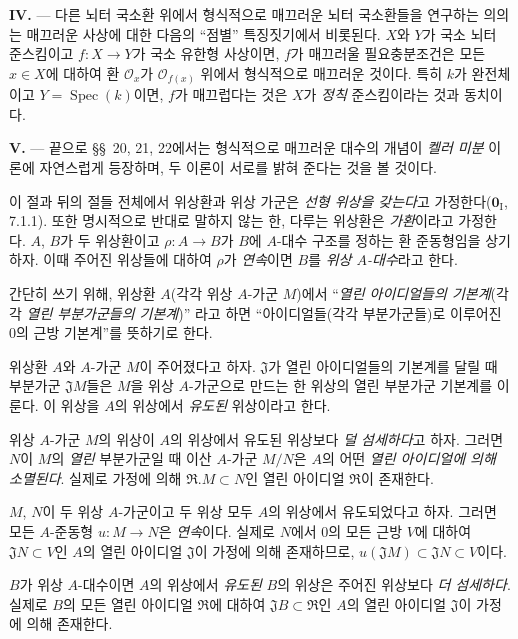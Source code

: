 \begin{env}[19.0.2]
\medskip\noindent\textbf{IV.} --- 다른 뇌터 국소환 위에서 형식적으로
매끄러운 뇌터 국소환들을 연구하는 의의는 매끄러운 사상에 대한
다음의 “점별” 특징짓기에서 비롯된다. $X$와 $Y$가 국소 뇌터
준스킴이고 $f:X\to Y$가 국소 유한형 사상이면, $f$가
매끄러울 필요충분조건은 모든 $x\in X$에 대하여 환
$\mathcal O_x$가 $\mathcal O_{f(x)}$ 위에서 형식적으로 매끄러운
것이다. 특히 $k$가 완전체이고 $Y=\operatorname{Spec}(k)$이면,
$f$가 매끄럽다는 것은 $X$가 \emph{정칙} 준스킴이라는 것과 동치이다.

\medskip\noindent\textbf{V.} --- 끝으로 §§~20, 21, 22에서는
형식적으로 매끄러운 대수의 개념이 \emph{켈러 미분} 이론에 자연스럽게
등장하며, 두 이론이 서로를 밝혀 준다는 것을 볼 것이다.
\end{env}

\begin{env}[19.0.3]
\label{0.19.0.3-fr}
이 절과 뒤의 절들 전체에서 위상환과 위상 가군은 \emph{선형 위상을
갖는다}고 가정한다($\mathbf{0}_{\mathrm I}$, 7.1.1). 또한 명시적으로
반대로 말하지 않는 한, 다루는 위상환은 \emph{가환}이라고 가정한다.
$A$, $B$가 두 위상환이고 $\rho:A\to B$가 $B$에 $A$-대수 구조를
정하는 환 준동형임을 상기하자. 이때 주어진 위상들에 대하여
$\rho$가 \emph{연속}이면 $B$를 \emph{위상 $A$-대수}라고 한다.

간단히 쓰기 위해, 위상환 $A$(각각 위상 $A$-가군 $M$)에서
“\emph{열린 아이디얼들의 기본계}(각각
\emph{열린 부분가군들의 기본계})”
라고 하면 “아이디얼들(각각 부분가군들)로 이루어진 $0$의 근방
기본계”를 뜻하기로 한다.

위상환 $A$와 $A$-가군 $M$이 주어졌다고 하자. $\mathfrak J$가
열린 아이디얼들의 기본계를 달릴 때 부분가군 $\mathfrak J M$들은
$M$을 위상 $A$-가군으로 만드는 한 위상의 열린 부분가군 기본계를
이룬다. 이 위상을 $A$의 위상에서 \emph{유도된} 위상이라고 한다.

위상 $A$-가군 $M$의 위상이 $A$의 위상에서 유도된 위상보다
\emph{덜 섬세하다}고 하자. 그러면 $N$이 $M$의 \emph{열린}
부분가군일 때 이산 $A$-가군 $M/N$은 $A$의 어떤 \emph{열린
아이디얼에 의해 소멸된다}. 실제로 가정에 의해
$\mathfrak R.M\subset N$인 열린 아이디얼 $\mathfrak R$이 존재한다.


$M$, $N$이 두 위상 $A$-가군이고 두 위상 모두 $A$의 위상에서
유도되었다고 하자. 그러면 모든 $A$-준동형 $u:M\to N$은
\emph{연속}이다. 실제로 $N$에서 $0$의 모든 근방 $V$에 대하여
$\mathfrak JN\subset V$인 $A$의 열린 아이디얼 $\mathfrak J$이
가정에 의해 존재하므로,
$u(\mathfrak JM)\subset\mathfrak JN\subset V$이다.

$B$가 위상 $A$-대수이면 $A$의 위상에서 \emph{유도된} $B$의 위상은
주어진 위상보다 \emph{더 섬세하다}. 실제로 $B$의 모든 열린
아이디얼 $\mathfrak R$에 대하여
$\mathfrak JB\subset\mathfrak R$인 $A$의 열린 아이디얼
$\mathfrak J$이 가정에 의해 존재한다.
\end{env}

